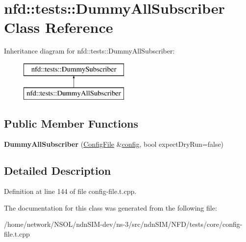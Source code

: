 \hypertarget{classnfd_1_1tests_1_1DummyAllSubscriber}{}\section{nfd\+:\+:tests\+:\+:Dummy\+All\+Subscriber Class Reference}
\label{classnfd_1_1tests_1_1DummyAllSubscriber}
Inheritance diagram for nfd\+:\+:tests\+:\+:Dummy\+All\+Subscriber\+:\begin{figure}[H]
\begin{center}
\leavevmode
\includegraphics[height=2.000000cm]{classnfd_1_1tests_1_1DummyAllSubscriber}
\end{center}
\end{figure}
\subsection*{Public Member Functions}
\begin{DoxyCompactItemize}
\item 
{\bfseries Dummy\+All\+Subscriber} (\hyperlink{classnfd_1_1ConfigFile}{Config\+File} \&\hyperlink{classconfig}{config}, bool expect\+Dry\+Run=false)\hypertarget{classnfd_1_1tests_1_1DummyAllSubscriber_af8008ed9738f91b0726ba5a0c51b2e1a}{}\label{classnfd_1_1tests_1_1DummyAllSubscriber_af8008ed9738f91b0726ba5a0c51b2e1a}

\end{DoxyCompactItemize}


\subsection{Detailed Description}


Definition at line 144 of file config-\/file.\+t.\+cpp.



The documentation for this class was generated from the following file\+:\begin{DoxyCompactItemize}
\item 
/home/network/\+N\+S\+O\+L/ndn\+S\+I\+M-\/dev/ns-\/3/src/ndn\+S\+I\+M/\+N\+F\+D/tests/core/config-\/file.\+t.\+cpp\end{DoxyCompactItemize}
